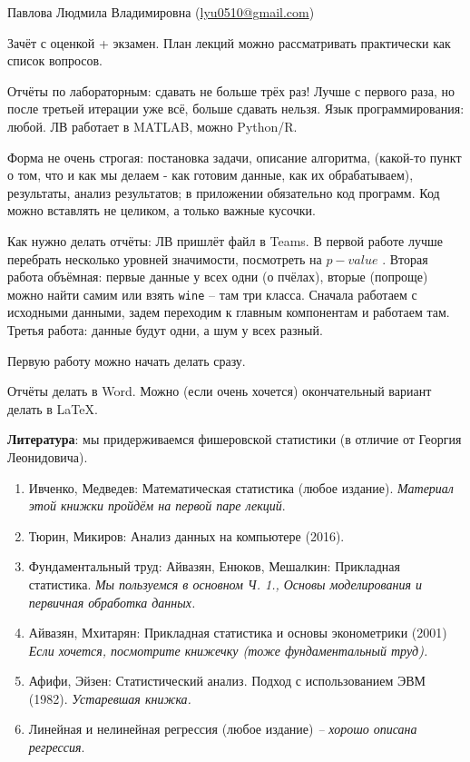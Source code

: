 \documentclass[a4paper,12pt]{report}
\begin{document}
	
    \tableofcontents
    \newpage

    Павлова Людмила Владимировна (\href{mailto:lyu0510@gmail.com}{lyu0510@gmail.com})

    Зачёт с оценкой + экзамен. План лекций можно рассматривать практически как список вопросов.

    Отчёты по лабораторным: сдавать не больше трёх раз!
    Лучше с первого раза, но после третьей итерации уже всё, больше сдавать нельзя.
    Язык программирования: любой.
    ЛВ работает в MATLAB, можно Python/R.

    Форма не очень строгая: постановка задачи, описание алгоритма, (какой-то пункт о том, что и как мы делаем - как готовим данные, как их обрабатываем), результаты, анализ результатов; в приложении обязательно код программ.
    Код можно вставлять не целиком, а только важные кусочки.

    Как нужно делать отчёты: ЛВ пришлёт файл в Teams.
    В первой работе лучше перебрать несколько уровней значимости, посмотреть на $ p-value $ .
    Вторая работа объёмная: первые данные у всех одни (о пчёлах), вторые (попроще) можно найти самим или взять \texttt{wine} -- там три класса.
    Сначала работаем с исходными данными, задем переходим к главным компонентам и работаем там.
    Третья работа: данные будут одни, а шум у всех разный.

    Первую работу можно начать делать сразу.

    Отчёты делать в Word\texttrademark.
    Можно (если очень хочется) окончательный вариант делать в \LaTeX.

    \textbf{Литература}: мы придерживаемся фишеровской статистики (в отличие от Георгия Леонидовича).
    \begin{enumerate}[noitemsep]
        \item Ивченко, Медведев: Математическая статистика (любое издание). \emph{Материал этой книжки пройдём на первой паре лекций}.
        \item Тюрин, Микиров: Анализ данных на компьютере (2016).
        \item Фундаментальный труд: Айвазян, Енюков, Мешалкин: Прикладная статистика.
        \emph{Мы пользуемся в основном Ч. 1., Основы моделирования и первичная обработка данных.}
        \item Айвазян, Мхитарян: Прикладная статистика и основы эконометрики (2001) \emph{Если хочется, посмотрите книжечку (тоже фундаментальный труд).} \label{item:aivazyan_mhitaryan}
        \item Афифи, Эйзен: Статистический анализ. Подход с использованием ЭВМ (1982). \emph{Устаревшая книжка.}
        \item Линейная и нелинейная регрессия (любое издание) \emph{-- хорошо описана регрессия}.
    \end{enumerate}
\end{document}
